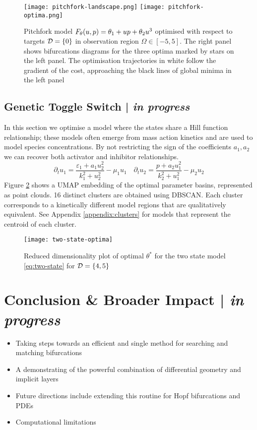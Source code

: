 \begin{figure}
\centering
\texttt{[image: pitchfork-landscape.png]}
\texttt{[image: pitchfork-optima.png]}
\caption{Pitchfork model $F_{\theta}(u,p) = \theta_{1} + u p +\theta_{2}u^3$ optimised with respect to targets $\mathcal{D}=\{0\}$ in observation region $\Omega\in[-5,5]$. The right panel shows bifurcations diagrams for the three optima marked by stars on the left panel. The optimisation trajectories in white follow the gradient of the cost, approaching the black lines of global minima in the left panel}
\label{fig:pitchfork:results}
\end{figure}

\subsection{Genetic Toggle Switch | \textit{in progress}}
In this section we optimise a model where the states share a Hill function relationship; these models often emerge from mass action kinetics and are used to model species concentrations. By not restricting the sign of the coefficients $a_1,a_2$ we can recover both activator and inhibitor relationships.
\begin{equation}
    \partial_t u_1 = \frac{\varepsilon_1 + a_1 u_2^2} { k_1^2 + u_2^2 } - \mu_1 u_1 \quad
    \partial_t u_2 = \frac{p + a_2 u_1^2} { k_2^2 + u_1^2 } - \mu_2 u_2
    \label{eq:two-state}
\end{equation}
Figure \ref{fig:two-state-optima} shows a UMAP embedding of the optimal parameter basins, represented as point clouds. 16 distinct clusters are obtained using DBSCAN. Each cluster corresponds to a kinetically different model regions that are qualitatively equivalent. See Appendix \ref{appendix:clusters} for models that represent the centroid of each cluster.
 
\begin{figure}
\centering
\texttt{[image: two-state-optima]}
\caption{Reduced dimensionality plot of optimal $\theta^*$ for the two state model \eqref{eq:two-state} for $\mathcal{D}=\{4,5\}$}
\label{fig:two-state-optima}
\end{figure}
 
\section{Conclusion \& Broader Impact | \textit{in progress}}
\begin{itemize}
    \item Taking steps towards an efficient and single method for searching and matching bifurcations
    \item A demonstrating of the powerful combination of differential geometry and implicit layers
    \item Future directions include extending this routine for Hopf bifurcations and PDEs
    \item Computational limitations
\end{itemize}

